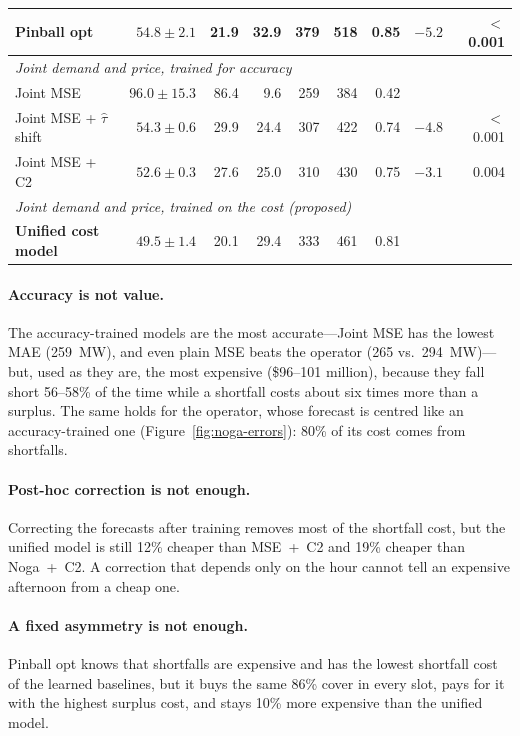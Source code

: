 \begin{table}[t]
{\begin{tabular}{lrrrrrrrr}
        Pinball opt         & $54.8\pm2.1$ & 21.9 & 32.9 & 379 & 518 & 0.85 & $-5.2$ & $<$0.001 \\
        \midrule
        \multicolumn{9}{l}{\textit{Joint demand and price, trained for accuracy}} \\
        Joint MSE                    & $96.0\pm15.3$ & 86.4 & 9.6 & 259 & 384 & 0.42 & & \\
        Joint MSE + $\hat\tau$ shift & $54.3\pm0.6$ & 29.9 & 24.4 & 307 & 422 & 0.74 & $-4.8$ & $<$0.001 \\
        Joint MSE + C2               & $52.6\pm0.3$ & 27.6 & 25.0 & 310 & 430 & 0.75 & $-3.1$ & 0.004 \\
        \midrule
        \multicolumn{9}{l}{\textit{Joint demand and price, trained on the cost (proposed)}} \\
        \textbf{Unified cost model} & $\mathbf{49.5\pm1.4}$ & 20.1 & 29.4 & 333 & 461 & 0.81 & & \\
        \bottomrule
    \end{tabular}}
\end{table}

\paragraph*{Accuracy is not value.}  The accuracy-trained models are the most
accurate---Joint MSE has the lowest MAE (259~MW), and even plain MSE beats the
operator (265 vs.\ 294~MW)---but, used as they are, the most expensive
(\$96--101 million), because they fall short 56--58\% of the time while a
shortfall costs about six times more than a surplus.  The same holds for the
operator, whose forecast is centred like an accuracy-trained one
(Figure~\ref{fig:noga-errors}): 80\% of its cost comes from shortfalls.

\paragraph*{Post-hoc correction is not enough.}  Correcting the forecasts
after training removes most of the shortfall cost, but the unified model is
still 12\% cheaper than MSE~+~C2 and 19\% cheaper than Noga~+~C2.  A
correction that depends only on the hour cannot tell an expensive afternoon
from a cheap one.

\paragraph*{A fixed asymmetry is not enough.}  Pinball opt knows that
shortfalls are expensive and has the lowest shortfall cost of the learned baselines,
but it buys the same 86\% cover in every slot, pays for it with the highest
surplus cost, and stays 10\% more expensive than the unified model.

